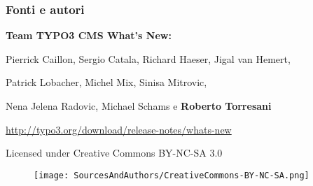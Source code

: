 \begin{frame}[fragile]
	\frametitle{Fonti e autori}

	\vspace{-0.6cm}

	\centerline{\textbf{Team TYPO3 CMS What's New:}}

	\begin{center}
		\centerline{Pierrick Caillon, Sergio Catala, Richard Haeser, Jigal van Hemert,}
		\centerline{Patrick Lobacher, Michel Mix, Sinisa Mitrovic,}
		\centerline{Nena Jelena Radovic, Michael Schams e \textbf{Roberto Torresani}}
	\end{center}

	\vspace{0.4cm}

	\smaller\begin{center}\url{http://typo3.org/download/release-notes/whats-new}\end{center}\normalsize

	\vspace{1cm}

	\smaller\begin{center}Licensed under Creative Commons BY-NC-SA 3.0\end{center}\normalsize
	\begin{figure}\vspace*{-0.4cm}
		\texttt{[image: SourcesAndAuthors/CreativeCommons-BY-NC-SA.png]}
	\end{figure}

\end{frame}

